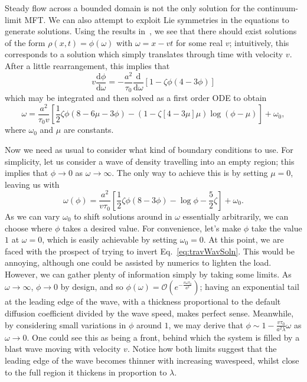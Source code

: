 Steady flow across a bounded domain is not the only solution for the continuum-limit MFT. We can also attempt to exploit Lie symmetries in the equations to generate solutions. Using the results in~\cite{ivanova2007},
we see that there should exist solutions of the form $\rho(x, t) = \phi(\omega)$ with $\omega = x-vt$ for some real $v$; intuitively, this corresponds to a solution which simply translates through time with velocity $v$.
After a little rearrangement, this implies that
\begin{equation}
 v \frac{\mathrm{d}\phi}{\mathrm{d}\omega} = -\frac{a^2}{\tau_0} \frac{\mathrm{d}}{\mathrm{d}\omega}\left[ 1-\zeta \phi \left(4-3\phi\right) \right]
\end{equation}
which may be integrated and then solved as a first order ODE to obtain
\begin{equation}
 \omega = \frac{a^2}{\tau_0 v} \left[ \frac{1}{2} \zeta \phi \left(8-6\mu-3\phi\right) - \left(1-\zeta\left[4-3\mu\right]\mu\right) \log{\left(\phi-\mu\right)} \right] + \omega_0,
\end{equation}
where $\omega_0$ and $\mu$ are constants.

Now we need as usual to consider what kind of boundary conditions to use. For simplicity, let us consider a wave of density travelling into an empty region; this implies that $\phi \rightarrow 0$ as $\omega \rightarrow \infty$.
The only way to achieve this is by setting $\mu=0$, leaving us with
\begin{equation}
\label{eq:travWavSoln}
 \omega(\phi) = \frac{a^2}{v\tau_0} \left[ \frac{1}{2}\zeta \phi(8-3\phi) - \log{\phi} - \frac{5}{2}\zeta \right] + \omega_0.
\end{equation}
As we can vary $\omega_0$ to shift solutions around in $\omega$ essentially arbitrarily, we can choose where $\phi$ takes a desired value. For convenience, let's make $\phi$ take the value $1$ at $\omega=0$, which is easily
achievable by setting $\omega_0 = 0$. At this point, we are faced with the prospect of trying to invert Eq.~\ref{eq:travWavSoln}. This would be annoying, although one could be assisted by numerics to lighten the load.
However, we can gather plenty of information simply by taking some limits. As $\omega \rightarrow \infty$, $\phi \rightarrow 0$ by design, and so $\phi(\omega) = \mathcal{O}(e^{-\frac{v\omega\tau_0}{a^2}})$; having an
exponential tail at the leading edge of the wave, with a thickness proportional to the default diffusion coefficient divided by the wave speed, makes perfect sense. Meanwhile, by considering small variations in $\phi$ around $1$,
we may derive that $\phi \sim 1-\frac{v \tau_0}{a^2 \lambda} \omega$ as $\omega \rightarrow 0$. One could see this as being a front, behind which the system is filled by a blast wave moving with velocity $v$. Notice how both
limits suggest that the leading edge of the wave becomes thinner with increasing wavespeed, whilst close to the full region it thickens in proportion to $\lambda$.

